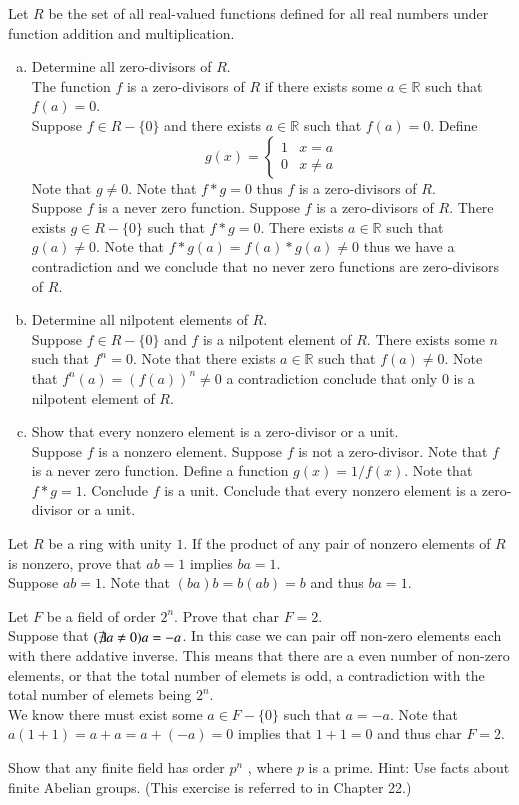 \documentclass[12pt]{article}
\makeatletter
\theoremstyle{homework}
\newenvironment{exercise}[1]
{\def\@currentlabel{#1}\exercisecore}
{\endexercisecore}
\makeatother
\begin{document}
\begin{exercise}{13.28}
Let $R$ be the set of all real-valued functions defined for all real numbers under function addition and multiplication.
\begin{enumerate}[a)]
\item
Determine all zero-divisors of $R$.\\
The function $f$ is a zero-divisors of $R$ if there exists some $a\in \mathbb{R}$ such that $f(a)=0$.\\
Suppose $f\in R-\{0\}$ and there exists $a\in \mathbb{R}$ such that $f(a)=0$.  Define $$g(x)=\begin{cases} 1 & x=a\\ 0 & x\neq a \end{cases}$$  Note that $g\neq 0$.  Note that $f*g=0$ thus $f$ is a zero-divisors of $R$.\\
Suppose $f$ is a never zero function.  Suppose $f$ is a zero-divisors of $R$.  There exists $g\in R-\{0\}$ such that $f*g=0$.  There exists $a\in \mathbb{R}$ such that $g(a)\neq 0$.  Note that $f*g(a)=f(a)*g(a)\neq 0$ thus we have a contradiction and we conclude that no never zero functions are zero-divisors of $R$.
\item
Determine all nilpotent elements of $R$.\\
Suppose $f\in R-\{0\}$ and $f$ is a nilpotent element of $R$.  There exists some $n$ such that $f^n=0$.  Note that there exists $a\in\mathbb{R}$ such that $f(a)\neq 0$.  Note that $f^n(a)=(f(a))^n\neq 0$ a contradiction conclude that only $0$ is a nilpotent element of $R$.
\item
Show that every nonzero element is a zero-divisor or a unit.\\
Suppose $f$ is a nonzero element.  Suppose $f$ is not a zero-divisor.  Note that $f$ is a never zero function.  Define a function $g(x)=1/f(x)$.  Note that $f*g=1$.  Conclude $f$ is a unit.  Conclude that every nonzero element is a zero-divisor or a unit.
\end{enumerate}
\end{exercise}

\begin{exercise}{13.31}
Let $R$ be a ring with unity $1$. If the product of any pair of nonzero elements of $R$ is nonzero, prove that $ab = 1$ implies $ba = 1$.\\
Suppose $ab = 1$.  Note that $(ba)b=b(ab)=b$ and thus $ba=1$.
\end{exercise}

\begin{exercise}{13.35}
Let $F$ be a field of order $2^n$. Prove that $\text{char } F = 2$.\\
Suppose that $(\not\exists a\neq 0) a=-a$.  In this case we can pair off non-zero elements each with there addative inverse.  This means that there are a even number of non-zero elements, or that the total number of elemets is odd, a contradiction with the total number of elemets being $2^n$.\\
We know there must exist some $a\in F-\{0\}$ such that $a=-a$.  Note that $a(1+1)=a+a=a+(-a)=0$ implies that $1+1=0$ and thus $\text{char } F = 2$.
\end{exercise}

\begin{exercise}{13.51}
Show that any finite field has order $p^n$ , where $p$ is a prime. Hint: Use facts about finite Abelian groups. (This exercise is referred to in Chapter 22.)
\end{exercise}
\end{document}
